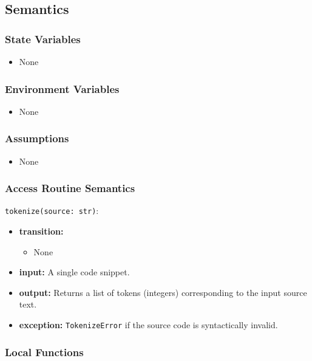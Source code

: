 \documentclass[12pt, titlepage]{article}
\begin{document}
\subsection{Semantics}

\subsubsection{State Variables}

\begin{itemize}
    \item None
\end{itemize}

\subsubsection{Environment Variables}

\begin{itemize}
  \item None
\end{itemize}

\subsubsection{Assumptions}

\begin{itemize}
    \item None
\end{itemize}

\subsubsection{Access Routine Semantics}

\noindent \texttt{tokenize(source: str)}:
\begin{itemize}
    \item \textbf{transition:}
    \begin{itemize}
        \item None
    \end{itemize}
    \item \textbf{input:} A single code snippet.
    \item \textbf{output:} Returns a list of tokens (integers) corresponding to the input source text.
    \item \textbf{exception:} \texttt{TokenizeError} if the source code is syntactically invalid.
\end{itemize}

\subsubsection{Local Functions}
\end{document}
